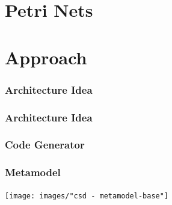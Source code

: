 \section*{Petri Nets}



\section{Approach}
\begin{frame}
  \centering
  \hspace{-1cm}
  \huge
\end{frame}

\begin{frame}
  \frametitle{Architecture Idea}
  
\end{frame}

\begin{frame}
  \frametitle{Architecture Idea}
  \centering
  
\end{frame}


\begin{frame}
  \frametitle{Code Generator}

  

\end{frame}


\begin{frame}
  \frametitle{Metamodel}
  \centering
  \hspace{-1cm}
  \texttt{[image: images/"csd - metamodel-base"]}
\end{frame}

